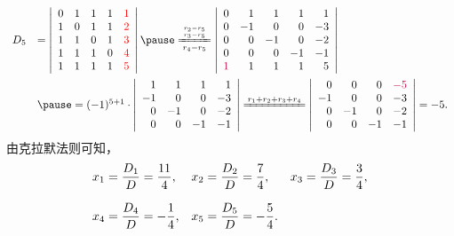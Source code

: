 \begin{frame}
  \begin{footnotesize}
    $$
    \begin{array}{rl}
      D_5 &= \left|
      \begin{array}{rrrrr}
        0&1&1&1&\red{1}\\
        1&0&1&1&\red{2}\\
        1&1&0&1&\red{3}\\
        1&1&1&0&\red{4}\\
        1&1&1&1&\red{5}\\
      \end{array}
      \right| \pause \xlongequal[r_4-r_5]{r_2-r_5\atop r_3-r_5}
      \left|
      \begin{array}{rrrrr}
        0&1&1&1&{1}\\
        0&-1&0&0&{-3}\\
        0&0&-1&0&{-2}\\
        0&0&0&-1&{-1}\\
        \purple{1}&1&1&1&{5}\\
      \end{array}
      \right| \\[0.4in]
      &\pause =  (-1)^{5+1} \cdot    
      \left|
      \begin{array}{rrrr}
        1&1&1&{1}\\
        -1&0&0&{-3}\\
        0&-1&0&{-2}\\
        0&0&-1&{-1}\\
      \end{array}
      \right|
      \xlongequal[]{r_1+r_2+r_3+r_4}
      \left|
      \begin{array}{rrrr}
        0&0&0&\purple{-5}\\
        -1&0&0&{-3}\\
        0&-1&0&{-2}\\
        0&0&-1&{-1}\\
      \end{array}\right| = -5.
    \end{array}
    $$
    \pause
    由克拉默法则可知，
    $$
    \begin{array}{lll}
      \displaystyle x_1 = \frac{D_1}D = \frac{11}4, &
      \displaystyle x_2 = \frac{D_2}D = \frac74, &
      \displaystyle x_3 = \frac{D_3}D = \frac34, \\[0.2in]
      \displaystyle x_4 = \frac{D_4}D = -\frac14, &
      \displaystyle x_5 = \frac{D_5}D = -\frac54.
    \end{array}
    $$
  \end{footnotesize}
\end{frame}

